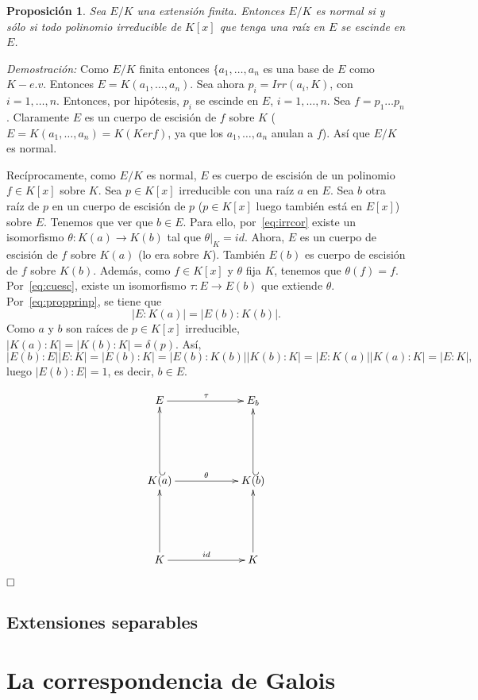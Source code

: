\documentclass[12pt]{article}
\newtheorem{proposition}[theorem]{Proposición}
\begin{document}
\begin{proposition}\label{eq:extnou} Sea $E/K$ una extensión finita. Entonces $E/K$ es normal si y sólo si todo polinomio irreducible de $K[x]$ que tenga una raíz en $E$ se escinde en $E$.
\end{proposition}
\emph{Demostración: } Como $E/K$ finita entonces $\lbrace a_{1}, \ldots, a_{n}$ es una base de $E$ como $K-e.v$. Entonces $E= K(a_{1}, \ldots, a_{n})$. Sea ahora $p_{i} = Irr(a_{i}, K)$, con $i = 1, \ldots, n$. Entonces, por hipótesis, $p_{i}$ se escinde en $E$, $i = 1, \ldots , n$. Sea $f = p_{1} \ldots p_{n}$. Claramente $E$ es un cuerpo de escisión de $f$ sobre $K$ ($E= K(a_{1}, \ldots, a_{n}) = K(Kerf)$, ya que los $a_{1}, \ldots, a_{n}$ anulan a $f$). Así que $E/K$ es normal.

Recíprocamente, como $E/K$ es normal, $E$ es cuerpo de escisión de un polinomio $f \in K[x]$ sobre $K$. Sea $p \in K[x]$ irreducible con una raíz $a$ en $E$. Sea $b$ otra raíz de $p$ en un cuerpo de escisión de $p$ ($p \in K[x]$ luego también está en $E[x]$) sobre $E$. Tenemos que ver que $b \in E$. Para ello, por~\ref{eq:irrcor} existe un isomorfismo $\theta \colon K(a) \longrightarrow K(b)$ tal que $\left.\theta \right|_K  = id$. Ahora, $E$ es un cuerpo de escisión de $f$ sobre $K(a)$ (lo era sobre $K$). También $E(b)$ es cuerpo de escisión de $f$ sobre $K(b)$. Además, como $f \in K[x]$ y $\theta$ fija $K$, tenemos que $\theta (f) = f$. Por~\ref{eq:cuesc}, existe un isomorfismo $\tau \colon E \longrightarrow E(b)$ que extiende $\theta$. Por~\ref{eq:propprinp}, se tiene que $$|E:K(a)| = |E(b) :K(b)|.$$ Como $a$ y $b$ son raíces de $p \in K[x]$ irreducible, $|K(a) :K| = |K(b) : K| = \delta (p)$. Así, $$|E(b) : E| |E: K| = |E(b): K| = |E(b) :K(b)| |K(b):K| = |E:K(a)| |K(a) :K| = |E:K|,$$ luego $|E(b) :E| = 1$, es decir, $b \in E$.

$$\xymatrix @=2cm {E\ar[r]^{\tau} & E_{b} \\ K(a)\ar[r]^{\theta} \ar@{_(->}[u] & K(b) \ar@{_(->}[u] \\ K \ar[r]^{id} \ar[u] & K \ar[u]  }$$

$\hfill \square$

\subsection{Extensiones separables}

\section{La correspondencia de Galois}
\end{document}

